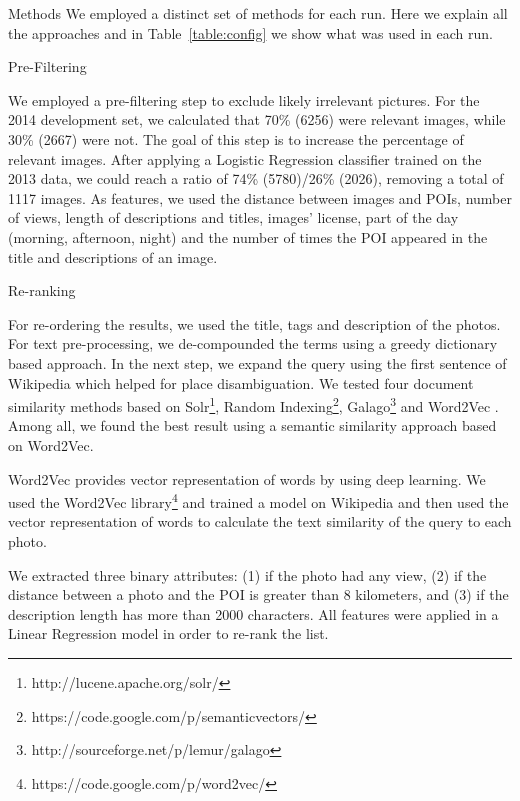 \documentclass{acm_proc_article-me}
\begin{document}
\begin{section}{Methods}
We employed a distinct set of methods for each run. 
Here we explain all the approaches and in Table~\ref{table:config} we show what was used in each run.

\begin{subsection}{Pre-Filtering}

We employed a pre-filtering step to exclude likely irrelevant pictures.
For the 2014 development set, we calculated that 70\% (6256) were relevant images, while 30\% (2667) were not.
The goal of this step is to increase the percentage of relevant images. 
After applying a Logistic Regression classifier trained on the 2013 data, we could reach a ratio of 74\% (5780)/26\% (2026), removing a total of 1117 images. As features, we used the distance between images and POIs, number of views, length of descriptions and titles, images' license, part of the day (morning, afternoon, night) and the number of times the POI appeared in the title and descriptions of an image.

\end{subsection}


\begin{subsection}{Re-ranking}

For re-ordering the results, we used the title, tags and description of the photos. For text pre-processing, we de-compounded the terms using a greedy dictionary based approach. In the next step, we expand the query using the first sentence of Wikipedia which helped for place disambiguation. We tested four document similarity methods based on Solr\footnote{http://lucene.apache.org/solr/}, Random Indexing\footnote{https://code.google.com/p/semanticvectors/}, Galago\footnote{http://sourceforge.net/p/lemur/galago} and Word2Vec \cite{word2vec}. Among all, we found the best result using a semantic similarity approach based on Word2Vec.

Word2Vec provides vector representation of words by using deep learning. We used the Word2Vec library\footnote{https://code.google.com/p/word2vec/} and trained a model on Wikipedia and then used the vector representation of words to calculate the text similarity of the query to each photo.

We extracted three binary attributes: (1) if the photo had any view, (2) if the distance between a photo and the POI is greater than 8 kilometers, and (3) if the description length has more than 2000 characters. All features were applied in a Linear Regression model in order to re-rank the list.


\end{subsection}
\end{section}
\end{document}
